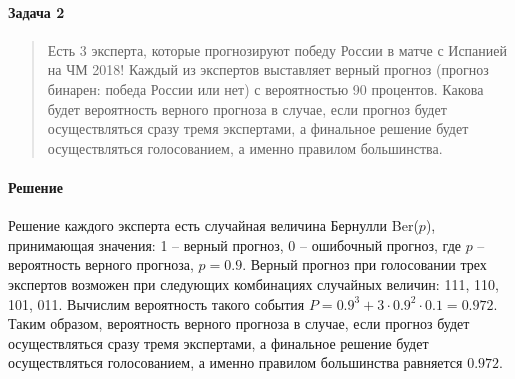 \documentclass[12pt, letterpaper, twoside]{article}
\begin{document}
 
\paragraph{Задача 2}
\begin{quotation} 
	Есть 3 эксперта, которые прогнозируют победу России в матче с Испанией на ЧМ 2018! Каждый из экспертов выставляет верный прогноз (прогноз бинарен: победа России или нет) с вероятностью 90 процентов. Какова будет вероятность верного прогноза в случае, если прогноз будет осуществляться сразу тремя экспертами, а финальное решение будет осуществляться голосованием, а именно правилом большинства.	
\end{quotation}
 
\paragraph{Решение}

Решение каждого эксперта есть случайная величина Бернулли Ber($p$), принимающая значения: 1 -- верный прогноз, 0 -- ошибочный прогноз, где $p$ -- вероятность верного прогноза, $p=0.9$.
Верный прогноз при голосовании трех экспертов возможен при следующих комбинациях случайных величин: 111, 110, 101, 011. Вычислим вероятность такого события $P=0.9^3+3 \cdot 0.9^2 \cdot 0.1=0.972$.
Таким образом, вероятность верного прогноза в случае, если прогноз будет осуществляться сразу тремя экспертами, а финальное решение будет осуществляться голосованием, а именно правилом большинства равняется $0.972$.
 
\end{document}

